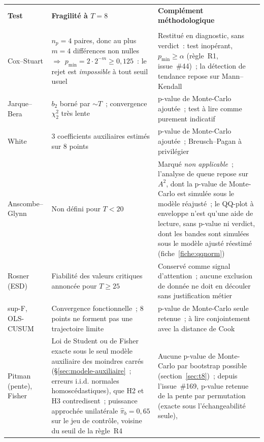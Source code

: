 \documentclass[a4paper,11pt]{article}
\begin{document}
\begin{center}
\small
{}
\begin{tabular}{@{}p{3.4cm}p{5.4cm}p{5.9cm}@{}}
\rowcolor{tableheader}
\textcolor{financeblue}{\textbf{Test}} &
\textcolor{financeblue}{\textbf{Fragilité à $T = 8$}} &
\textcolor{financeblue}{\textbf{Complément méthodologique}} \\
\rowcolor{tableheader}
\multicolumn{3}{@{}l@{}}{\textcolor{financeblue}{\textbf{Méthode lognormale}}} \\
Cox--Stuart & $n_p = 4$ paires, donc au plus $m = 4$ différences non nulles
$\Rightarrow$ $p_{\min} = 2\cdot 2^{-m} \ge 0{,}125$~: le rejet est \emph{impossible} à tout
seuil usuel & Restitué en diagnostic, sans verdict~: test inopérant, $p_{\min} \ge \alpha$
(règle~R1, issue~\#44)~; la détection de tendance repose sur Mann--Kendall \\
Jarque--Bera & $b_2$ borné par $\sim T$~; convergence $\chi^2_2$ très lente &
p-value de Monte-Carlo ajoutée~; test à lire comme purement indicatif \\
White & 3 coefficients auxiliaires estimés sur 8 points & p-value de
Monte-Carlo ajoutée~; Breusch--Pagan à privilégier \\
Anscombe--Glynn & Non défini pour $T < 20$ & Marqué \emph{non applicable}~;
l'analyse de queue repose sur $A^2$, dont la p-value de Monte-Carlo est simulée
sous le modèle réajusté~; le QQ-plot à enveloppe n'est qu'une aide de lecture, sans p-value
ni verdict, dont les bandes sont simulées sous le modèle ajusté réestimé
(fiche~\ref{fiche:qqnorm}) \\
Rosner (ESD) & Fiabilité des valeurs critiques annoncée pour $T \ge 25$ &
Conservé comme signal d'attention~; aucune exclusion de donnée ne doit en
découler sans justification métier \\
sup-F, OLS-CUSUM & Convergence fonctionnelle~; 8 points ne forment pas une
trajectoire limite & p-value de Monte-Carlo seule retenue~; à lire
conjointement avec la distance de Cook \\
Pitman (pente), Fisher & Loi de Student ou de Fisher exacte sous le seul modèle auxiliaire des
moindres carrés (§\ref{sec:modele-auxiliaire}~; erreurs i.i.d. normales homoscédastiques), que H2
et H3 contredisent~; puissance approchée unilatérale $\hat\pi_b = 0{,}65$ sur le jeu de contrôle,
voisine du seuil de la règle~R4 &
Aucune p-value de Monte-Carlo par bootstrap possible (section~\ref{sec:t8})~; depuis
l'issue~\#169, p-value retenue de la pente par permutation (exacte sous l'échangeabilité seule),

\end{tabular}
\end{center}
\end{document}
